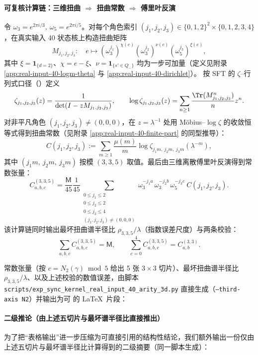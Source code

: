 \paragraph{可复核计算链：三维扭曲 $\Rightarrow$ 扭曲常数 $\Rightarrow$ 傅里叶反演}
令 $\omega_3=e^{2\pi i/3},\ \omega_5=e^{2\pi i/5}$。对每个角色索引 $(j_1,j_2,j_3)\in\{0,1,2\}^2\times\{0,1,2,3,4\}$，在真实输入 40 状态核上构造扭曲矩阵
$$
M_{j_1,j_2,j_3}:\quad
e\mapsto (\omega_3^{j_1})^{\chi(e)}(\omega_3^{j_2})^{\nu(e)}(\omega_5^{j_3})^{\xi(e)},
$$
其中 $\xi=\mathbf{1}_{\{d=2\}}$、$\chi=e-\xi$、$\nu=\mathbf{1}_{\{s'\in Q_-\}}$ 均为一步可加量（定义见附录 \ref{app:real-input-40-logm-theta} 与 \ref{app:real-input-40-dirichlet}）。
按 SFT 的 $\zeta$--行列式口径（\cite{BrinStuck2002}）定义
$$
\zeta_{j_1,j_2,j_3}(z)=\frac{1}{\det(I-zM_{j_1,j_2,j_3})},
\qquad
\log\zeta_{j_1,j_2,j_3}(z)=\sum_{n\ge 1}\frac{\Tr(M_{j_1,j_2,j_3}^n)}{n}z^n.
$$
对非平凡角色 $(j_1,j_2,j_3)\neq(0,0,0)$，在 $z=\lambda^{-1}$ 处用 Möbius--$\log\zeta$ 的收敛恒等式得到扭曲常数（见附录 \ref{app:real-input-40-finite-part} 的同型推导）：
$$
C(j_1,j_2,j_3):=\sum_{m\ge 1}\frac{\mu(m)}{m}\log\zeta_{j_1m,\ j_2m,\ j_3m}(\lambda^{-m}),
$$
其中 $(j_1m,\ j_2m,\ j_3m)$ 按模 $(3,3,5)$ 取值。最后由三维离散傅里叶反演得到常数张量：
$$
C^{(3,3,5)}_{a,b,c}
=\frac{\mathsf{M}}{45}
\frac{1}{45}\!\!\!\sum_{\substack{0\le j_1\le 2\\0\le j_2\le 2\\0\le j_3\le 4\\(j_1,j_2,j_3)\ne(0,0,0)}}
\omega_3^{-j_1 a}\,\omega_3^{-j_2 b}\,\omega_5^{-j_3 c}\ C(j_1,j_2,j_3).
$$
该计算链同时输出最坏扭曲谱半径比 $\rho_{3,3,5}/\lambda$（指数误差尺度）与两条校验：
$$
\sum_{a,b,c}C^{(3,3,5)}_{a,b,c}=\mathsf{M},
\qquad
\sum_{c=0}^{4}C^{(3,3,5)}_{a,b,c}=C^{(3,3)}_{a,b}.
$$

常数张量（按 $c=N_2(\gamma)\bmod 5$ 给出 5 张 $3\times 3$ 切片）、最坏扭曲谱半径比 $\rho_{3,3,5}/\lambda$、以及上述校验的数值误差，由脚本
\texttt{scripts/exp\_sync\_kernel\_real\_input\_40\_arity\_3d.py}
直接生成（\texttt{--third-axis N2}）并输出为可 \verb|| 的 \LaTeX\ 片段：


\paragraph{二级推论（由上述五切片与最坏谱半径比直接推出）}
为了把“表格输出”进一步压缩为可直接引用的结构性结论，我们额外输出一份仅由上述五切片与最坏谱半径比计算得到的二级摘要（同一脚本生成）：


